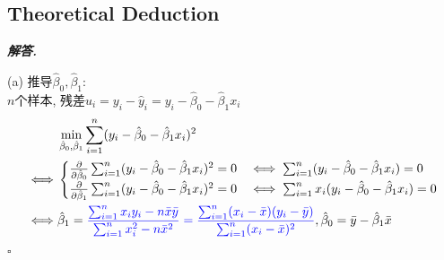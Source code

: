 \documentclass[10pt, a4paper, oneside]{ctexart}
\newenvironment{solution}{%
  \par\noindent\textbf{\textit{解答. }}\ignorespaces
}{%
  \hfill\ensuremath{\square}\par %
}
\begin{document}
\subsection{Theoretical Deduction}
\begin{solution}
(a) 推导$\hat{\beta}_0, \hat{\beta}_1$:\\
$n$个样本, 残差$u_i = y_i - \hat{y}_i = y_i - \hat{\beta}_0 - \hat{\beta}_1x_i$
\begin{align*}
  &\min_{\hat{\beta}_0, \hat{\beta}_1} \sum_{i=1}^{n} (y_i - \hat{\beta}_0 - \hat{\beta}_1x_i)^2\\
  \iff& \begin{cases}
    \frac{\partial }{\partial \hat{\beta}_0}\sum_{i=1}^{n} (y_i - \hat{\beta}_0 - \hat{\beta}_1x_i)^2=0 &\iff \sum_{i=1}^n (y_i -\hat{\beta}_0 - \hat{\beta}_1x_i )=0\\
  \frac{\partial }{\partial \hat{\beta}_1}\sum_{i=1}^{n} (y_i - \hat{\beta}_0 - \hat{\beta}_1x_i)^2=0 &\iff \sum_{i=1}^n x_i(y_i -\hat{\beta}_0 - \hat{\beta}_1x_i )=0
   \end{cases} \\
  \iff& \hat{\beta}_1 = \textcolor{blue}{\frac{\sum_{i=1}^n x_iy_i - n\bar{x}\bar{y}}{\sum_{i=1}^n x_i^2 - n\bar{x}^2} = \frac{\sum_{i=1}^n (x_i-\bar{x})(y_i-\bar{y}) }{\sum_{i=1}^n (x_i-\bar{x})^2}}, \hat{\beta}_0 = \bar{y}- \hat{\beta}_1\bar{x}
\end{align*}


\end{solution}
\end{document}
